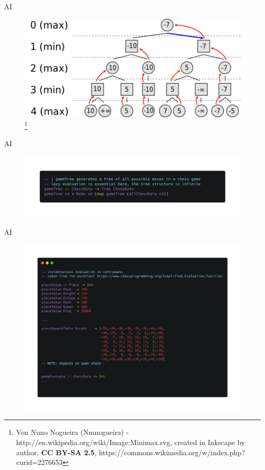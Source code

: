 \documentclass{beamer}
\begin{document}
\begin{frame}
\begin{columns}
\end{columns}

\end{frame}

\begin{frame}{AI}
\begin{figure}
\includegraphics[width=\linewidth]{minmaxwiki.png}
\footnote{\tiny Von Nuno Nogueira (Nmnogueira) - http://en.wikipedia.org/wiki/Image:Minimax.svg, created in Inkscape by author, \textbf{CC BY-SA 2.5}, https://commons.wikimedia.org/w/index.php?curid=2276653}
\end{figure}
\end{frame}

\begin{frame}{AI}
\begin{figure}
\includegraphics[width=\linewidth]{gametree}
\end{figure}
\end{frame}

\begin{frame}{AI}
\begin{figure}
\includegraphics[width=\linewidth]{instanteval}
\end{figure}
\end{frame}
\end{document}
